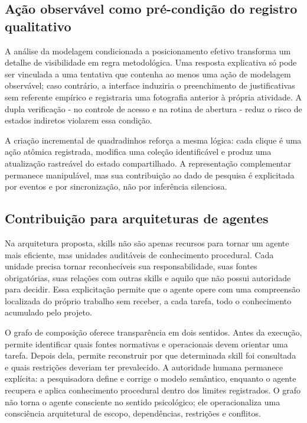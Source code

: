 \documentclass[preprint,12pt,authoryear]{elsarticle}
\begin{document}
\subsection{Ação observável como pré-condição do registro qualitativo}
A análise da modelagem condicionada a posicionamento efetivo transforma um detalhe de visibilidade em regra metodológica. Uma resposta explicativa só pode ser vinculada a uma tentativa que contenha ao menos uma ação de modelagem observável; caso contrário, a interface induziria o preenchimento de justificativas sem referente empírico e registraria uma fotografia anterior à própria atividade. A dupla verificação - no controle de acesso e na rotina de abertura - reduz o risco de estados indiretos violarem essa condição.

A criação incremental de quadradinhos reforça a mesma lógica: cada clique é uma ação atômica registrada, modifica uma coleção identificável e produz uma atualização rastreável do estado compartilhado. A representação complementar permanece manipulável, mas sua contribuição ao dado de pesquisa é explicitada por eventos e por sincronização, não por inferência silenciosa.

\subsection{Contribuição para arquiteturas de agentes}

Na arquitetura proposta, skills não são apenas recursos para tornar um agente mais eficiente, mas unidades auditáveis de conhecimento procedural. Cada unidade precisa tornar reconhecíveis sua responsabilidade, suas fontes obrigatórias, suas relações com outras skills e aquilo que não possui autoridade para decidir. Essa explicitação permite que o agente opere com uma compreensão localizada do próprio trabalho sem receber, a cada tarefa, todo o conhecimento acumulado pelo projeto.

O grafo de composição oferece transparência em dois sentidos. Antes da execução, permite identificar quais fontes normativas e operacionais devem orientar uma tarefa. Depois dela, permite reconstruir por que determinada skill foi consultada e quais restrições deveriam ter prevalecido. A autoridade humana permanece explícita: a pesquisadora define e corrige o modelo semântico, enquanto o agente recupera e aplica conhecimento procedural dentro dos limites registrados. O grafo não torna o agente consciente no sentido psicológico; ele operacionaliza uma consciência arquitetural de escopo, dependências, restrições e conflitos.
\end{document}
